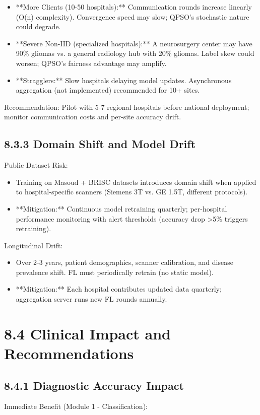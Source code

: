 \begin{itemize}
  \item **More Clients (10-50 hospitals):** Communication rounds increase linearly (O(n) complexity). Convergence speed may slow; QPSO's stochastic nature could degrade.
  \item **Severe Non-IID (specialized hospitals):** A neurosurgery center may have 90\% gliomas vs. a general radiology hub with 20\% gliomas. Label skew could worsen; QPSO's fairness advantage may amplify.
  \item **Stragglers:** Slow hospitals delaying model updates. Asynchronous aggregation (not implemented) recommended for 10+ sites.
\end{itemize}

Recommendation: Pilot with 5-7 regional hospitals before national deployment; monitor communication costs and per-site accuracy drift.


\subsection{8.3.3 Domain Shift and Model Drift}
Public Dataset Risk:

\begin{itemize}
  \item Training on Masoud + BRISC datasets introduces domain shift when applied to hospital-specific scanners (Siemens 3T vs. GE 1.5T, different protocols).
  \item **Mitigation:** Continuous model retraining quarterly; per-hospital performance monitoring with alert thresholds (accuracy drop >5\% triggers retraining).
\end{itemize}

Longitudinal Drift:

\begin{itemize}
  \item Over 2-3 years, patient demographics, scanner calibration, and disease prevalence shift. FL must periodically retrain (no static model).
  \item **Mitigation:** Each hospital contributes updated data quarterly; aggregation server runs new FL rounds annually.
\end{itemize}


\section{8.4 Clinical Impact and Recommendations}

\subsection{8.4.1 Diagnostic Accuracy Impact}
Immediate Benefit (Module 1 - Classification):


